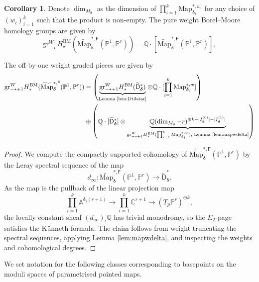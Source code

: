 \documentclass[12pt,reqno]{amsart}
\theoremstyle{definition}
\theoremstyle{definition}
\theoremstyle{definition}
\theoremstyle{definition}
\newtheorem{corollary}[theorem]{Corollary}
\newcommand{\gr}{\mathrm{gr}}
\begin{document}
\begin{corollary}\label{cor:genDF}
   Denote $\dim_{M_{\boldsymbol{\delta}}}$ as the dimension of $\prod_{i=1}^k \mathrm{Map}_{\boldsymbol{\delta}_i}^{*,w_i}$ for any choice of $(w_i)_{i=1}^k$ such that the product is non-empty. The pure weight Borel--Moore homology groups are given by $$\gr^W_{-\star} H^{\mathrm{BM}}_\star(\widetilde{\mathrm{Map}}_{\boldsymbol{\delta}}^{*, \mathsf{F}}(\mathbb{P}^1, \mathbb{P}^r)) = \mathbb{Q}\cdot [\widetilde{\mathrm{Map}}_{\boldsymbol{\delta}}^{*, \mathsf{F}}(\mathbb{P}^1, \mathbb{P}^r)],$$
  
  The off-by-one weight graded pieces are given by \begin{align*}\gr^W_{-\star+1} H^{\mathrm{BM}}_\star(\widetilde{\mathrm{Map}}_{\boldsymbol{\delta}}^{*, \mathsf{F}}(\mathbb{P}^1, \mathbb{P}^r)) & = \left(\underbrace{\mathrm{gr}^W_{-\star+1}H^{\mathrm{BM}}_\star(\widetilde{\mathsf{D}}_{\boldsymbol{\delta}}^*)}_{\text{Lemma \ref{lem:Dtilstar}}}\otimes \mathbb{Q}\cdot [\prod_{i=1}^k\mathrm{Map}_{\boldsymbol{\delta}_i}^{*,w}] \right)\\ & \oplus \left(\mathbb{Q}\cdot [\widetilde{\mathsf{D}}_{\boldsymbol{\delta}}^*]\otimes \underbrace{\mathbb{Q}(\dim_{M_{\boldsymbol{\delta}}}-r)^{\oplus k-|I_{\boldsymbol{\delta}}^{(0)}|-|I_{\boldsymbol{\delta}}^{(1)}|}}_{\gr^W_{-\star+1}H^{\mathrm{BM}}_\star(\prod_{i=1}^k\mathrm{Map}_{\boldsymbol{\delta}_i}^{*,w}), \text{ Lemma \ref{lem:mapwdelta}}}\right)\end{align*}
\end{corollary}
\begin{proof}
We compute the compactly supported cohomology of $\widetilde{\mathrm{Map}}_{\boldsymbol{\delta}}^{*, \mathsf{F}}(\mathbb{P}^1, \mathbb{P}^r)$ by the Leray spectral sequence of the map $$d_\infty: \widetilde{\mathrm{Map}}_{\boldsymbol{\delta}}^{*, \mathsf{F}}(\mathbb{P}^1, \mathbb{P}^r)\to {\widetilde{\mathsf{D}}}^*_{\boldsymbol{\delta}}.$$ As the map is the pullback of the linear projection map $$\prod_{i=1}^k \mathbb{A}^{\boldsymbol{\delta}_i(r+1)}\to \prod_{i=1}^k \mathbb{C}^{r+1}\to (T_p \mathbb{P}^r)^{\oplus k},$$ the locally constant sheaf $(d_{\infty})_! \mathbb{Q}$ has trivial monodromy, so the $E_2$-page satisfies the Künneth formula. The claim follows from weight truncating the spectral sequences, applying Lemma \ref{lem:mapwdelta}, and inspecting the weights and cohomological degrees.
\end{proof}

We set notation for the following classes corresponding to basepoints on the moduli spaces of parametrised pointed maps.
\end{document}
